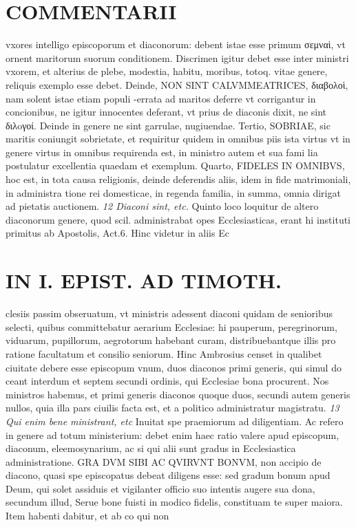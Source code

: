 \documentclass{article}
\begin{document}
\begin{pages}
\section*{COMMENTARII }
\marginpar{[ p.74 ]}\pstart vxores intelligo episcoporum et diaconorum: debent istae esse primum σεμναὶ, vt ornent maritorum suorum conditionem. Discrimen igitur debet esse inter ministri vxorem, et alterius de plebe, modestia, habitu, moribus, totoq. vitae genere, reliquis exemplo esse debet. Deinde, NON SINT CALVMMEATRICES, διαβολοὶ, nam solent istae etiam populi -errata ad maritos deferre vt corrigantur in concionibus, ne igitur innocentes deferant, vt prius de diaconis dixit, ne sint διλoγοί. Deinde in genere ne sint garrulae, nugiuendae.  \pend\pstart Tertio, SOBRIAE, sic maritis coniungit sobrietate, et requiritur quidem in omnibus piis ista virtus vt in genere virtus in omnibus requirenda est, in ministro autem et sua fami lia postulatur excellentia quaedam et exemplum.  \pend\pstart Quarto, FIDELES IN OMNIBVS, hoc est, in tota causa religionis, deinde deferendis aliis, idem in fide matrimoniali, in administra tione rei domesticae, in regenda familia, in summa, omnia dirigat ad pietatis auctionem.  \pend
\textit{12 Diaconi sint, etc. }\pstart Quinto loco loquitur de altero diaconorum genere, quod scil. administrabat opes Ecclesiasticas, erant hi instituti primitus ab Apostolis, Act.6. Hinc videtur in aliis Ec\pend
\section*{IN I. EPIST. AD TIMOTH. }
\marginpar{[ p.75 ]}\pstart clesiis passim obseruatum, vt ministris adessent diaconi quidam de senioribus selecti, quibus committebatur aerarium Ecclesiae: hi pauperum, peregrinorum, viduarum, pupillorum, aegrotorum habebant curam, distribuebantque illis pro ratione facultatum et consilio seniorum. Hinc Ambrosius censet in qualibet ciuitate debere esse episcopum vnum, duos diaconos primi generis, qui simul do ceant interdum et septem secundi ordinis, qui Ecclesiae bona procurent. Nos ministros habemus, et primi generis diaconos quoque duos, secundi autem generis nullos, quia illa pars ciuilis facta est, et a politico administratur magistratu.  \pend
\textit{13 Qui enim bene ministrant, etc }\pstart Inuitat spe praemiorum ad diligentiam. Ac refero in genere ad totum ministerium: debet enim haec ratio valere apud episcopum, diaconum, eleemosynarium, ac si qui alii sunt gradus in Ecclesiastica administratione. GRA DVM SIBI AC QVIRVNT BONVM, non accipio de diacono, quasi spe episcopatus debeat diligens esse: sed gradum bonum apud Deum, qui solet assiduis et vigilanter officio suo intentis augere sua dona, secundum illud, Serue bone fuisti in modico fidelis, constituam te super maiora.  \pend\pstart Item habenti dabitur, et ab co qui non  \pend

\end{pages}
\end{document}
